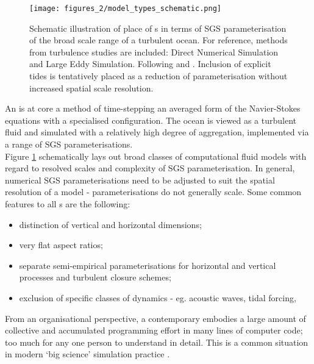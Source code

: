 \begin{figure}[h]
\begin{center}
\texttt{[image: figures\_2/model\_types\_schematic.png]}
\caption{Schematic illustration of place of \OGCM{}s in terms of SGS parameterisation of the broad scale range of a turbulent ocean.  For reference, methods from turbulence studies are included: Direct Numerical Simulation and Large Eddy Simulation. Following \citep[fig 5.2]{Petersen:2012tr} and \citep{Stevens:2001kb}.  Inclusion of explicit tides is tentatively placed as a reduction of parameterisation without increased spatial scale resolution.}
\label{fig:models}
\end{center}
\end{figure}


An \OGCM{} is at core a method of time-stepping an averaged form of the Navier-Stokes equations with a specialised configuration. The ocean is viewed as a turbulent fluid and simulated with a relatively high degree of aggregation, implemented via a range of SGS parameterisations.\\
Figure \ref{fig:models} schematically lays out broad classes of computational fluid models with regard to resolved scales and complexity of SGS parameterisation.  In general, numerical SGS parameterisations need to be adjusted to suit the spatial resolution of a model - parameterisations do not generally scale.
Some common features to all \OGCM{}s are the following:
\begin{itemize}
\item distinction of vertical and horizontal dimensions;
\item very flat aspect ratios;
\item separate semi-empirical parameterisations for horizontal and vertical processes and turbulent closure schemes;
\item exclusion of specific classes of dynamics - eg. acoustic waves, tidal forcing, 
\end{itemize}



From an organisational perspective, a contemporary \OGCM{} embodies a large amount of collective and accumulated programming effort in many lines of computer code; too much for any one person to understand in detail.  This is a common situation in modern `big science' simulation practice \citep{Petersen:2012tr}. \\





